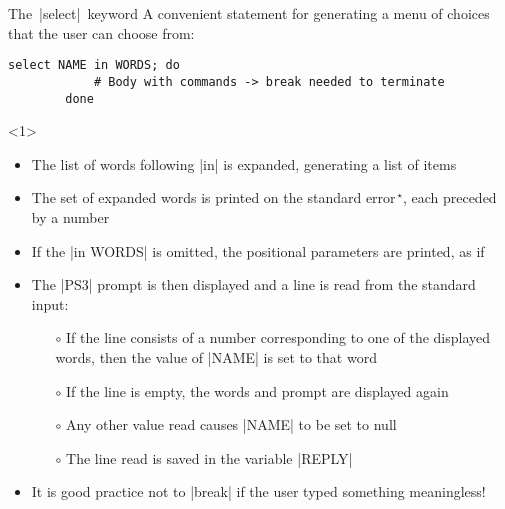 \begin{frame}[fragile]{The \,\bash|select|\, keyword}
    \vspace{-3mm}
    A convenient statement for generating a menu of choices that the user can choose from:
    \medskip
    \begin{lstlisting}[style=MyBash, numbers=none, belowskip=-5mm]
        select NAME in WORDS; do
            # Body with commands -> break needed to terminate
        done
    \end{lstlisting}
    \vspace{1.5mm}
    \begin{overlayarea}{\textwidth}{\textheight}
        \begin{onlyenv}<1>
            \vspace{1.5mm}
            \begin{itemize}
                \item The list of words following \;\bash|in|\; is expanded, generating a list of items
                \item The set of expanded words is printed on the \alert{standard error}$^{\,\star}$, each preceded by a number
                \item If the \;\bash|in WORDS|\; is omitted, the positional parameters are printed, as if \;
                \item The \;\bash|PS3|\; prompt is then displayed and a line is read from the standard input:
                      \begin{itemize}
                          \item[$\circ$] If the line consists of a number corresponding to one of the displayed words, then the value of \;\bash|NAME|\; is set to that word
                          \item[$\circ$] If the line is empty, the words and prompt are displayed again
                          \item[$\circ$] Any other value read causes \;\bash|NAME|\; to be set to null
                          \item[$\circ$] The line read is saved in the variable \;\bash|REPLY|
                      \end{itemize}
                \item It is good practice not to \;\bash|break|\; if the user typed something meaningless!
            \end{itemize}
        \end{onlyenv}

\end{overlayarea}
\end{frame}
